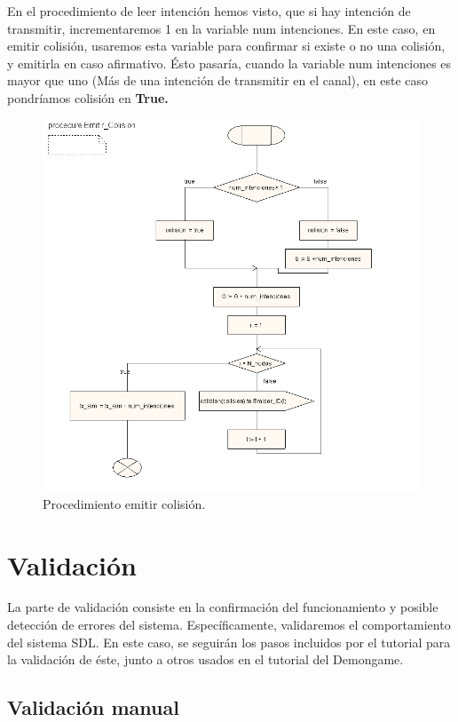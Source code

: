 \documentclass{article}
\begin{document}
En el procedimiento de leer intención hemos visto, que si hay intención de transmitir, incrementaremos 1 en la variable num intenciones. En este caso, en emitir colisión, usaremos esta variable para confirmar si existe o no una colisión, y emitirla en caso afirmativo. Ésto pasaría, cuando la variable num intenciones es mayor que uno (Más de una intención de transmitir en el canal), en este caso pondríamos colisión en \textbf{True.}

\quad

\begin{figure}[h]
    \centering
    \includegraphics[width=0.8\linewidth]{src/proc emitir col.png}
    \caption{\label{fig:emitircol} Procedimiento emitir colisión.}
\end{figure}
\newpage

\section{Validación}

La parte de validación consiste en la confirmación del funcionamiento y posible detección de errores del sistema. Específicamente, validaremos el comportamiento del sistema SDL. En este caso, se seguirán los pasos incluidos por el tutorial para la validación de éste, junto a otros usados en el tutorial del Demongame.

\quad

\subsection{Validación manual}
\end{document}
